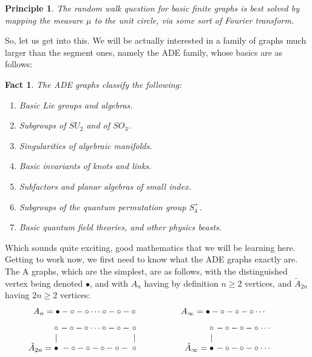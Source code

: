 \documentclass[12pt]{amsbook}
\newtheorem{fact}[theorem]{Fact}
\newtheorem{principle}[theorem]{Principle}
\begin{document}
\begin{principle}
The random walk question for basic finite graphs is best solved by mapping the measure $\mu$ to the unit circle, via some sort of Fourier transform. 
\end{principle}

So, let us get into this. We will be actually interested in a family of graphs much larger than the segment ones, namely the ADE family, whose basics are as follows:


\begin{fact}
The ADE graphs classify the following:
\begin{enumerate}
\item Basic Lie groups and algebras.

\item Subgroups of $SU_2$ and of $SO_3$.

\item Singularities of algebraic manifolds.

\item Basic invariants of knots and links.

\item Subfactors and planar algebras of small index.

\item Subgroups of the quantum permutation group $S_4^+$.

\item Basic quantum field theories, and other physics beasts.
\end{enumerate}
\end{fact}

Which sounds quite exciting, good mathematics that we will be learning here. Getting to work now, we first need to know what the ADE graphs exactly are. The A graphs, which are the simplest, are as follows, with the distinguished vertex being denoted $\bullet$, and with $A_n$ having by definition $n\geq2$ vertices, and $\tilde{A}_{2n}$ having $2n\geq2$ vertices:
$$A_n=\bullet-\circ-\circ\cdots\circ-\circ-\circ\hskip18mm 
A_{\infty}=\bullet-\circ-\circ-\circ\cdots\hskip7mm$$
\vskip-3mm
$$\ \ \ \ \ \ \ \tilde{A}_{2n}=
\begin{matrix}
\circ&\!\!\!\!-\circ-\circ\cdots\circ-\circ-&\!\!\!\!\circ\\
|&&\!\!\!\!|\\
\bullet&\!\!\!\!-\circ-\circ-\circ-\circ-&\!\!\!\!\circ\\
\\
\\
\end{matrix}\hskip20mm 
\tilde{A}_\infty=
\begin{matrix}
\circ&\!\!\!\!-\circ-\circ-\circ\cdots\\
|&\\
\bullet&\!\!\!\!-\circ-\circ-\circ\cdots\\
\\
\\
\end{matrix}
\hskip15mm$$
\vskip-7mm
\end{document}
